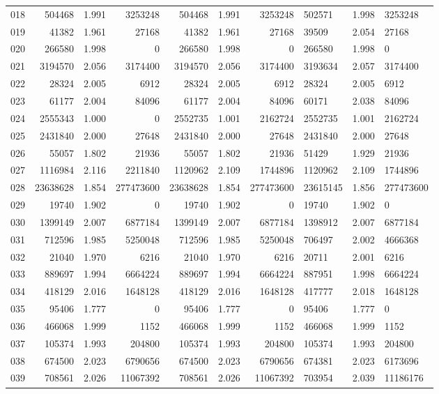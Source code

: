 \begin{longtable}{crrrrrr}
018 & 504468 & 1.991 & 3253248 & 504468 & 1.991 & 3253248 & 502571 & 1.998 & 3253248 \\
019 & 41382 & 1.961 & 27168 & 41382 & 1.961 & 27168 & 39509 & 2.054 & 27168 \\
020 & 266580 & 1.998 & 0 & 266580 & 1.998 & 0 & 266580 & 1.998 & 0 \\
021 & 3194570 & 2.056 & 3174400 & 3194570 & 2.056 & 3174400 & 3193634 & 2.057 & 3174400 \\
022 & 28324 & 2.005 & 6912 & 28324 & 2.005 & 6912 & 28324 & 2.005 & 6912 \\
023 & 61177 & 2.004 & 84096 & 61177 & 2.004 & 84096 & 60171 & 2.038 & 84096 \\
024 & 2555343 & 1.000 & 0 & 2552735 & 1.001 & 2162724 & 2552735 & 1.001 & 2162724 \\
025 & 2431840 & 2.000 & 27648 & 2431840 & 2.000 & 27648 & 2431840 & 2.000 & 27648 \\
026 & 55057 & 1.802 & 21936 & 55057 & 1.802 & 21936 & 51429 & 1.929 & 21936 \\
027 & 1116984 & 2.116 & 2211840 & 1120962 & 2.109 & 1744896 & 1120962 & 2.109 & 1744896 \\
028 & 23638628 & 1.854 & 277473600 & 23638628 & 1.854 & 277473600 & 23615145 & 1.856 & 277473600 \\
029 & 19740 & 1.902 & 0 & 19740 & 1.902 & 0 & 19740 & 1.902 & 0 \\
030 & 1399149 & 2.007 & 6877184 & 1399149 & 2.007 & 6877184 & 1398912 & 2.007 & 6877184 \\
031 & 712596 & 1.985 & 5250048 & 712596 & 1.985 & 5250048 & 706497 & 2.002 & 4666368 \\
032 & 21040 & 1.970 & 6216 & 21040 & 1.970 & 6216 & 20711 & 2.001 & 6216 \\
033 & 889697 & 1.994 & 6664224 & 889697 & 1.994 & 6664224 & 887951 & 1.998 & 6664224 \\
034 & 418129 & 2.016 & 1648128 & 418129 & 2.016 & 1648128 & 417777 & 2.018 & 1648128 \\
035 & 95406 & 1.777 & 0 & 95406 & 1.777 & 0 & 95406 & 1.777 & 0 \\
036 & 466068 & 1.999 & 1152 & 466068 & 1.999 & 1152 & 466068 & 1.999 & 1152 \\
037 & 105374 & 1.993 & 204800 & 105374 & 1.993 & 204800 & 105374 & 1.993 & 204800 \\
038 & 674500 & 2.023 & 6790656 & 674500 & 2.023 & 6790656 & 674381 & 2.023 & 6173696 \\
039 & 708561 & 2.026 & 11067392 & 708561 & 2.026 & 11067392 & 703954 & 2.039 & 11186176 \\

\end{longtable}
